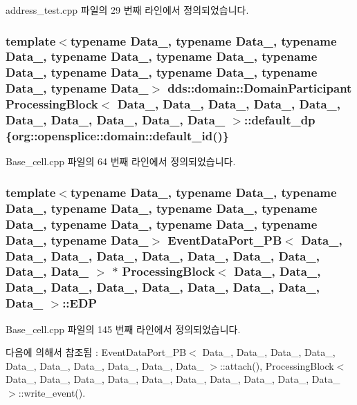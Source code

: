 address\+\_\+test.\+cpp 파일의 29 번째 라인에서 정의되었습니다.

\subsubsection[{\texorpdfstring{default\+\_\+dp}{default_dp}}]{\setlength{\rightskip}{0pt plus 5cm}template$<$typename Data\+\_, typename Data\+\_, typename Data\+\_, typename Data\+\_, typename Data\+\_, typename Data\+\_, typename Data\+\_, typename Data\+\_, typename Data\+\_, typename Data\+\_$>$ dds\+::domain\+::\+Domain\+Participant {\bf Processing\+Block}$<$ Data\+\_, Data\+\_, Data\+\_, Data\+\_, Data\+\_, Data\+\_, Data\+\_, Data\+\_, Data\+\_, Data\+\_ $>$\+::default\+\_\+dp \{org\+::opensplice\+::domain\+::default\+\_\+id()\}}\hypertarget{classProcessingBlock_ac7fe933d16fd30553840dfe2febfe3eb}{}\label{classProcessingBlock_ac7fe933d16fd30553840dfe2febfe3eb}


Base\+\_\+cell.\+cpp 파일의 64 번째 라인에서 정의되었습니다.

\subsubsection[{\texorpdfstring{E\+DP}{EDP}}]{\setlength{\rightskip}{0pt plus 5cm}template$<$typename Data\+\_, typename Data\+\_, typename Data\+\_, typename Data\+\_, typename Data\+\_, typename Data\+\_, typename Data\+\_, typename Data\+\_, typename Data\+\_, typename Data\+\_$>$ {\bf Event\+Data\+Port\+\_\+\+PB}$<$ Data\+\_, Data\+\_, Data\+\_, Data\+\_, Data\+\_, Data\+\_, Data\+\_, Data\+\_, Data\+\_, Data\+\_ $>$ $\ast$ {\bf Processing\+Block}$<$ Data\+\_, Data\+\_, Data\+\_, Data\+\_, Data\+\_, Data\+\_, Data\+\_, Data\+\_, Data\+\_, Data\+\_ $>$\+::E\+DP}\hypertarget{classProcessingBlock_a31a0bf1c1d88a5f5bb1ce325a61eba54}{}\label{classProcessingBlock_a31a0bf1c1d88a5f5bb1ce325a61eba54}


Base\+\_\+cell.\+cpp 파일의 145 번째 라인에서 정의되었습니다.



다음에 의해서 참조됨 \+:  Event\+Data\+Port\+\_\+\+P\+B$<$ Data\+\_, Data\+\_, Data\+\_, Data\+\_, Data\+\_, Data\+\_, Data\+\_, Data\+\_, Data\+\_, Data\+\_ $>$\+::attach(), Processing\+Block$<$ Data\+\_, Data\+\_, Data\+\_, Data\+\_, Data\+\_, Data\+\_, Data\+\_, Data\+\_, Data\+\_, Data\+\_ $>$\+::write\+\_\+event().

